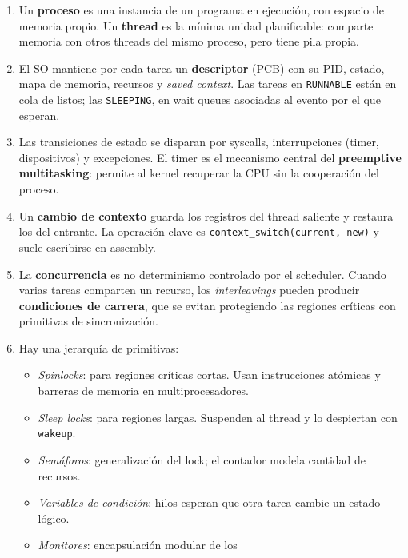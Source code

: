 \documentclass[11pt,a4paper]{article}
\begin{document}
\begin{enumerate}[leftmargin=*]
    \item Un \textbf{proceso} es una instancia de un programa en
        ejecución, con espacio de memoria propio. Un \textbf{thread}
        es la mínima unidad planificable: comparte memoria con otros
        threads del mismo proceso, pero tiene pila propia.
    \item El SO mantiene por cada tarea un \textbf{descriptor} (PCB)
        con su PID, estado, mapa de memoria, recursos y \emph{saved
        context}. Las tareas en \texttt{RUNNABLE} están en cola de
        listos; las \texttt{SLEEPING}, en wait queues asociadas al
        evento por el que esperan.
    \item Las transiciones de estado se disparan por syscalls,
        interrupciones (timer, dispositivos) y excepciones. El timer
        es el mecanismo central del \textbf{preemptive multitasking}:
        permite al kernel recuperar la CPU sin la cooperación del
        proceso.
    \item Un \textbf{cambio de contexto} guarda los registros del
        thread saliente y restaura los del entrante. La operación
        clave es \texttt{context\_switch(current, new)} y suele
        escribirse en assembly.
    \item La \textbf{concurrencia} es no determinismo controlado por
        el scheduler. Cuando varias tareas comparten un recurso, los
        \emph{interleavings} pueden producir
        \textbf{condiciones de carrera}, que se evitan protegiendo
        las regiones críticas con primitivas de sincronización.
    \item Hay una jerarquía de primitivas:
        \begin{itemize}[leftmargin=*,nosep]
            \item \emph{Spinlocks}: para regiones críticas cortas.
                Usan instrucciones atómicas y barreras de memoria en
                multiprocesadores.
            \item \emph{Sleep locks}: para regiones largas. Suspenden
                al thread y lo despiertan con \texttt{wakeup}.
            \item \emph{Semáforos}: generalización del lock; el
                contador modela cantidad de recursos.
            \item \emph{Variables de condición}: hilos esperan que
                otra tarea cambie un estado lógico.
            \item \emph{Monitores}: encapsulación modular de los

\end{itemize}
\end{enumerate}
\end{document}
